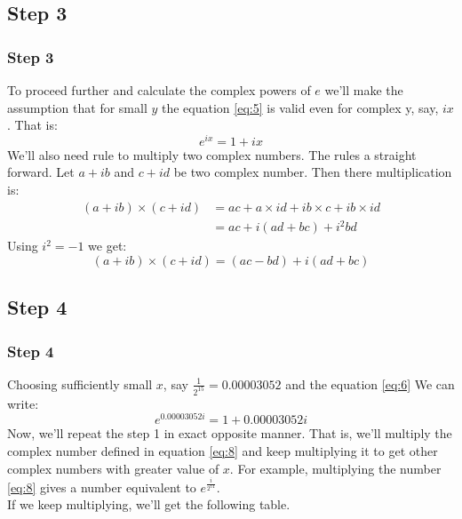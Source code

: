\documentclass{beamer}
\begin{document}
\subsection{Step 3}
\begin{frame}
    \frametitle{Step 3}
    To proceed further and calculate the complex powers of $e$ we'll make the assumption that for small $y$ the equation \ref{eq:5} is valid even for complex y, say, $ix$. That is:
    \begin{equation}
        \label{eq:6}
        e^{ix} = 1 + ix
    \end{equation}
\pause
We'll also need rule to multiply two complex numbers. The rules a straight forward. Let $a+ib$ and $c+id$ be two complex number. Then there multiplication is:
\begin{equation*}
    \begin{split}
        (a+ib)\times (c+id) &=ac + a\times id + ib\times c + ib\times id \\
        &=ac + i(ad+bc) + i^2bd
    \end{split}
\end{equation*}
Using $i^2 = -1$ we get:
\begin{equation}
    \label{eq:7}
    (a+ib)\times (c+id) = (ac-bd) + i(ad+bc)
\end{equation}
\end{frame}

\subsection{Step 4}
\begin{frame}
    \frametitle{Step 4}
 Choosing sufficiently small $x$, say $\frac{1}{2^{15}} = 0.00003052$ and the equation \ref{eq:6} We can write:
    \begin{equation}
        \label{eq:8}
        e^{0.00003052i} = 1 + 0.00003052i
    \end{equation}
\pause
Now, we'll repeat the step 1 in exact opposite manner. That is, we'll multiply the complex number defined in equation \ref{eq:8} and keep multiplying it to get other complex numbers with greater value of $x$. For example, multiplying the number \ref{eq:8} gives a number equivalent to $e^{\frac{i}{2^{14}}}$. \\ If we keep multiplying, we'll get the following table.
\end{frame}
\end{document}
